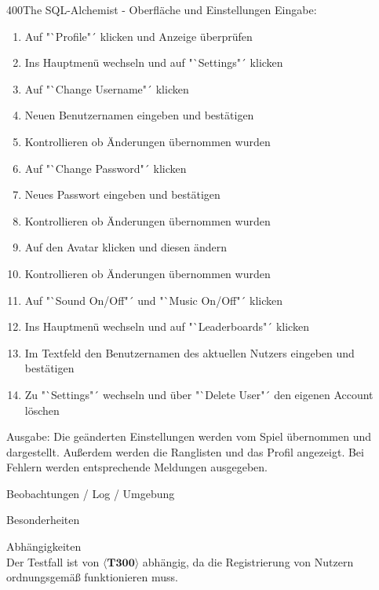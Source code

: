 \begin{testcase}{400}{The SQL-Alchemist - Oberfläche und Einstellungen}
Eingabe:
\begin{enumerate}
\item Auf "`Profile"´ klicken und Anzeige überprüfen
\item Ins Hauptmenü wechseln und auf "`Settings"´ klicken
\item Auf "`Change Username"´ klicken
\item Neuen Benutzernamen eingeben und bestätigen
\item Kontrollieren ob Änderungen übernommen wurden 
\item Auf "`Change Password"´ klicken
\item Neues Passwort eingeben und bestätigen
\item Kontrollieren ob Änderungen übernommen wurden
\item Auf den Avatar klicken und diesen ändern
\item Kontrollieren ob Änderungen übernommen wurden
\item Auf "`Sound On/Off"´ und "`Music On/Off"´ klicken 
\item Ins Hauptmenü wechseln und auf "`Leaderboards"´ klicken
\item Im Textfeld den Benutzernamen des aktuellen Nutzers eingeben und bestätigen
\item Zu "`Settings"´ wechseln und über "`Delete User"´ den eigenen Account löschen
\end{enumerate}
Ausgabe:
Die geänderten Einstellungen werden vom Spiel übernommen und dargestellt. Außerdem werden die Ranglisten und das Profil angezeigt. Bei Fehlern werden entsprechende Meldungen ausgegeben.

\item[Beobachtungen / Log / Umgebung]~\\

\item[Besonderheiten]~\\

\item[Abhängigkeiten]~\\
Der Testfall ist von $\langle\textbf{T300}\rangle$ abhängig, da die Registrierung von Nutzern ordnungsgemäß funktionieren muss.

\end{testcase}

